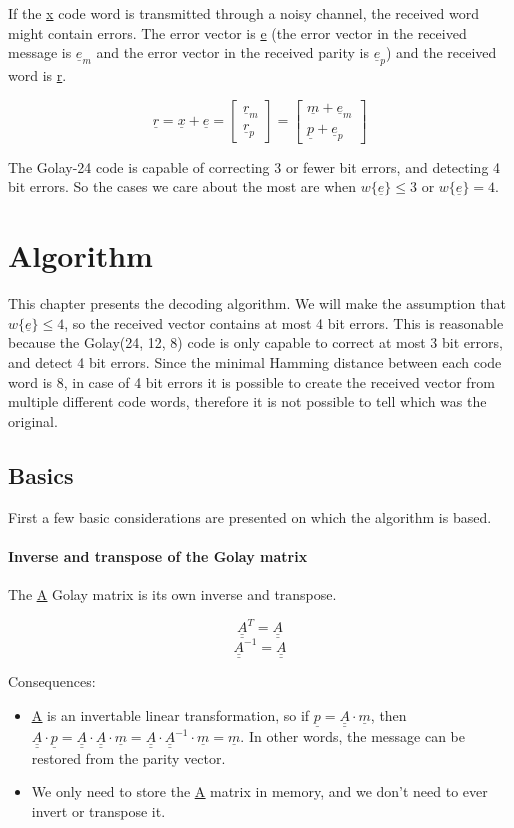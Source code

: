 \documentclass[11pt,a4paper,oneside]{report}             %
\def\doubleunderline#1{\underline{\underline{#1}}}
\def\dul#1{\doubleunderline{#1}}
\def\ul#1{\underline{#1}}
\newcommand{\vect}[2]{\begin{bmatrix} #1 \\ #2 \end{bmatrix}}
\begin{document}
If the \underline{x} code word is transmitted through a noisy channel, the received word might
contain errors. The error vector is \underline{e} (the error vector in the received message 
is $\underline{e}_m$ and the error vector in the received parity is $\underline{e}_p$)
and the received word is \underline{r}.

\[
    \ul{r} = \ul{x} + \ul{e} = \vect{\ul{r}_m}{\ul{r}_p} = \vect{\ul{m} + \ul{e}_m}{\ul{p} + \ul{e}_p}
\]

The Golay-24 code is capable of correcting 3 or fewer
bit errors, and detecting 4 bit errors. So the cases we care about the most are when $w\{\ul{e}\} \leq 3$
or $w\{\ul{e}\} = 4$.

\chapter{Algorithm}

This chapter presents the decoding algorithm. We will make the assumption that $w\{\ul{e}\} \leq 4$,
so the received vector contains at most 4 bit errors. This is reasonable because the Golay(24, 12, 8)
code is only capable to correct at most 3 bit errors, and detect 4 bit errors. Since the minimal
Hamming distance between each code word is 8, in case of 4 bit errors it is possible to create the
received vector from multiple different code words, therefore it is not possible to tell which was
the original.

\section{Basics}

First a few basic considerations are presented on which the algorithm is based.

\subsubsection{Inverse and transpose of the Golay matrix}

The \dul{A} Golay matrix is its own inverse and transpose.

\[
    \dul{A}^T = \dul{A}
\]
\[
    \dul{A}^{-1} = \dul{A}
\]

Consequences:
\begin{itemize}
    \item \dul{A} is an invertable linear transformation, so if $\ul{p} = \dul{A} \cdot \ul{m}$, then
          $\dul{A} \cdot \ul{p} = \dul{A} \cdot \dul{A} \cdot \ul{m} = \dul{A} \cdot \dul{A}^{-1} \cdot \ul{m} = \ul{m}$.
          In other words, the message can be restored from the parity vector.
    \item We only need to store the \dul{A} matrix in memory, and we don't need to ever invert or transpose it.
\end{itemize}
\end{document}
